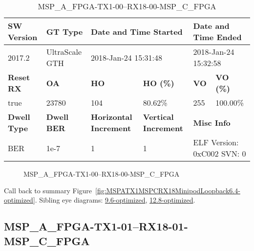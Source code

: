\begin{table}[h]
\centering
\caption{MSP\_A\_FPGA-TX1-00--RX18-00-MSP\_C\_FPGA}
\label{tab:MSPAFPGATX100RX1800MSPCFPGA6.4-optimized}
\begin{tabular}{@{}|l|l|l|l|l|l|@{}}
\toprule
\textbf{SW Version}                & \textbf{GT Type}   & \multicolumn{2}{l|}{\textbf{Date and Time Started}}            & \multicolumn{2}{l|}{\textbf{Date and Time Ended}}        \\ \midrule
2017.2                       & UltraScale GTH          & \multicolumn{2}{l|}{2018-Jan-24 15:31:48}                   & \multicolumn{2}{l|}{2018-Jan-24 15:32:58}               \\ \midrule
\textbf{Reset RX}                  & \textbf{OA} & \textbf{HO}   & \textbf{HO (\%)} & \textbf{VO} & \textbf{VO (\%)} \\ \midrule
true & 23780        & 104          & 80.62\%        & 255        & 100.00\%       \\ \midrule
\textbf{Dwell Type}                & \textbf{Dwell BER} & \textbf{Horizontal Increment} & \textbf{Vertical Increment}    & \multicolumn{2}{l|}{\textbf{Misc Info}}                  \\ \midrule
BER                            & 1e-7        & 1        & 1           & \multicolumn{2}{l|}{ELF Version: 0xC002 SVN: 0}                         \\ \bottomrule
\end{tabular}
\end{table}

\begin{figure}[h]
\caption{MSP\_A\_FPGA-TX1-00--RX18-00-MSP\_C\_FPGA} \label{fig:MSPAFPGATX100RX1800MSPCFPGA6.4-optimized}
\end{figure}

Call back to summary Figure~\ref{fig:MSPATX1MSPCRX18MinipodLoopback6.4-optimized}.
Sibling eye diagrams: \hyperref[sec:MSPAFPGATX100RX1800MSPCFPGA9.6-optimized]{9.6-optimized}, \hyperref[sec:MSPAFPGATX100RX1800MSPCFPGA12.8-optimized]{12.8-optimized}.

\clearpage
\newpage


\subsection{MSP\_A\_FPGA-TX1-01--RX18-01-MSP\_C\_FPGA}\label{sec:MSPAFPGATX101RX1801MSPCFPGA6.4-optimized}


